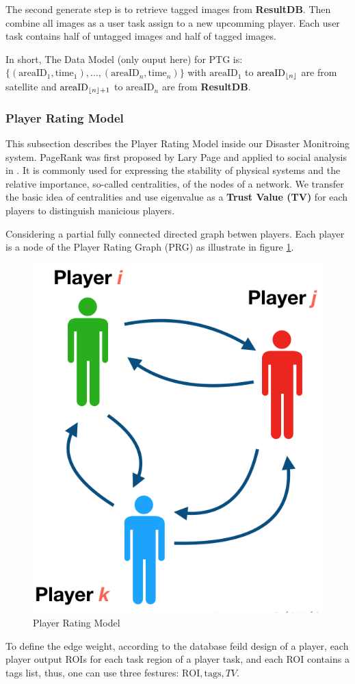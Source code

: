   The second generate step is to retrieve tagged images from \textbf{ResultDB}. Then combine
  all images as a user task assign to a new upcomming player. Each user task contains 
  half of untagged images and half of tagged images.

  In short, The Data Model (only ouput here) for PTG is:
  $\{(\text{areaID}_1, \text{time}_1), ..., (\text{areaID}_n, \text{time}_n)\}$
  with $\text{areaID}_1$ to $\text{areaID}_{\lfloor n\rfloor}$ are from satellite and 
  $\text{areaID}_{\lfloor n\rfloor+1}$ to $\text{areaID}_{n}$ are from \textbf{ResultDB}.

\subsubsection{Player Rating Model}

  This subsection describes the Player Rating Model inside our Disaster Monitroing system.
  PageRank was first proposed by Lary Page \cite{page1999pagerank} and applied to social analysis in \cite{bonacich2001eigenvector}. 
  It is commonly used for expressing the stability of physical systems and the relative importance, 
  so-called centralities, of the nodes of a network. We transfer the basic idea of centralities 
  and use eigenvalue as a \textbf{Trust Value (TV)} for each players to distinguish manicious players.

  Considering a partial fully connected directed graph betwen players. 
  Each player is a node of the Player Rating Graph (PRG) as illustrate in figure \ref{fig:graph}.

  \begin{figure}[htp]
  \centering
  \includegraphics[width=0.3\columnwidth]{figures/graph}
  \caption{Player Rating Model}
  \label{fig:graph}
  \end{figure}
  
  To define the edge weight, according to the database feild design of a player, each player
  output ROIs for each task region of a player task, and each ROI contains a tags list, thus, 
  one can use three festures: $\text{ROI}, \text{tags}, TV$.

